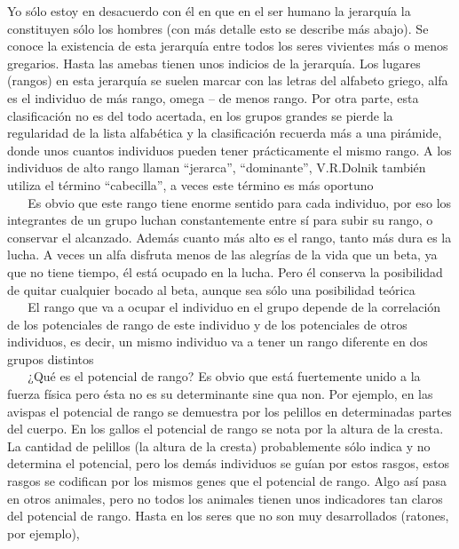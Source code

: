 Yo sólo estoy en desacuerdo con él en que en el ser humano la jerarquía
la constituyen sólo los hombres (con más detalle esto se describe más
abajo). Se conoce la existencia de esta jerarquía entre todos los seres
vivientes más o menos gregarios. Hasta las amebas tienen unos indicios
de la jerarquía. Los lugares (rangos) en esta jerarquía se suelen marcar
con las letras del alfabeto griego, alfa es el individuo de más rango,
omega -- de menos rango. Por otra parte, esta clasificación no es del
todo acertada, en los grupos grandes se pierde la regularidad de la
lista alfabética y la clasificación recuerda más a una pirámide, donde
unos cuantos individuos pueden tener prácticamente el mismo rango. A los
individuos de alto rango llaman ``jerarca'', ``dominante'', V.R.Dolnik
también utiliza el término ``cabecilla'', a veces este término es más
oportuno\\
\hspace*{0.333em} ~ ~ Es obvio que este rango tiene enorme sentido para
cada individuo, por eso los integrantes de un grupo luchan
constantemente entre sí para subir su rango, o conservar el alcanzado.
Además cuanto más alto es el rango, tanto más dura es la lucha. A veces
un alfa disfruta menos de las alegrías de la vida que un beta, ya que no
tiene tiempo, él está ocupado en la lucha. Pero él conserva la
posibilidad de quitar cualquier bocado al beta, aunque sea sólo una
posibilidad teórica\\
\hspace*{0.333em} ~ ~ El rango que va a ocupar el individuo en el grupo
depende de la correlación de los potenciales de rango de este individuo
y de los potenciales de otros individuos, es decir, un mismo individuo
va a tener un rango diferente en dos grupos distintos\\
\hspace*{0.333em} ~ ~ ¿Qué es el potencial de rango? Es obvio que está
fuertemente unido a la fuerza física pero ésta no es su determinante
sine qua non. Por ejemplo, en las avispas el potencial de rango se
demuestra por los pelillos en determinadas partes del cuerpo. En los
gallos el potencial de rango se nota por la altura de la cresta. La
cantidad de pelillos (la altura de la cresta) probablemente sólo indica
y no determina el potencial, pero los demás individuos se guían por
estos rasgos, estos rasgos se codifican por los mismos genes que el
potencial de rango. Algo así pasa en otros animales, pero no todos los
animales tienen unos indicadores tan claros del potencial de rango.
Hasta en los seres que no son muy desarrollados (ratones, por ejemplo),
